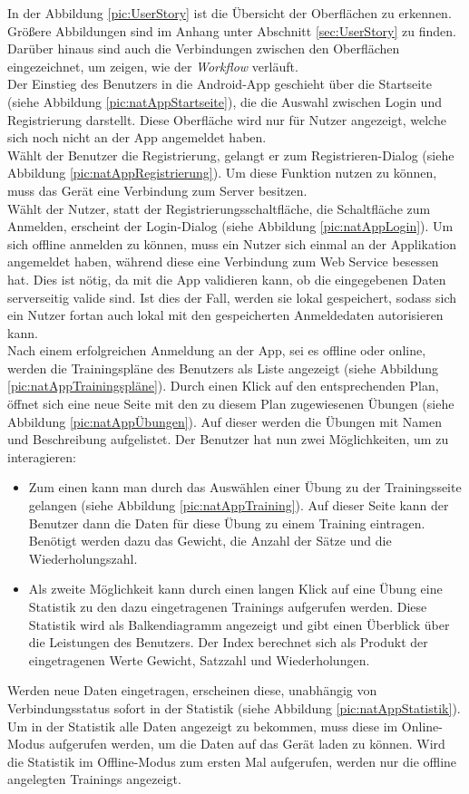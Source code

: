 In der Abbildung \ref{pic:UserStory} ist die Übersicht der Oberflächen zu erkennen. Größere Abbildungen sind im Anhang unter Abschnitt \ref{sec:UserStory} zu finden. Darüber hinaus sind auch die Verbindungen zwischen den Oberflächen eingezeichnet, um zeigen, wie der \textit{Workflow} verläuft.\\
Der Einstieg des Benutzers in die \gls{Android}-\gls{App} geschieht über die Startseite (siehe Abbildung \ref{pic:natAppStartseite}), die die Auswahl zwischen Login und Registrierung darstellt. Diese Oberfläche wird nur für Nutzer angezeigt, welche sich noch nicht an der \gls{App} angemeldet haben. \\ \newpage
Wählt der Benutzer die Registrierung, gelangt er zum Registrieren-Dialog (siehe Abbildung \ref{pic:natAppRegistrierung}). Um diese Funktion nutzen zu können, muss das Gerät eine Verbindung zum Server besitzen. \\
Wählt der Nutzer, statt der Registrierungsschaltfläche, die Schaltfläche zum Anmelden, erscheint der Login-Dialog (siehe Abbildung \ref{pic:natAppLogin}). Um sich offline anmelden zu können, muss ein Nutzer sich einmal an der Applikation angemeldet haben, während diese eine Verbindung zum Web Service besessen hat. Dies ist nötig, da mit die \gls{App} validieren kann, ob die eingegebenen Daten serverseitig valide sind. Ist dies der Fall, werden sie lokal gespeichert, sodass sich ein Nutzer fortan auch lokal mit den gespeicherten Anmeldedaten autorisieren kann.\\
Nach einem erfolgreichen Anmeldung an der \gls{App}, sei es offline oder online, werden die Trainingspläne des Benutzers als Liste angezeigt (siehe Abbildung \ref{pic:natAppTrainingspläne}). Durch einen Klick auf den entsprechenden Plan, öffnet sich eine neue Seite mit den zu diesem Plan zugewiesenen Übungen (siehe Abbildung \ref{pic:natAppÜbungen}). Auf dieser werden die Übungen mit Namen und Beschreibung aufgelistet. Der Benutzer hat nun zwei Möglichkeiten, um zu interagieren: 
\begin{itemize}
\item Zum einen kann man durch das Auswählen einer Übung zu der Trainingsseite gelangen (siehe Abbildung \ref{pic:natAppTraining}). Auf dieser Seite kann der Benutzer dann die Daten für diese Übung zu einem Training eintragen. Benötigt werden dazu das Gewicht, die Anzahl der Sätze und die Wiederholungszahl.
\item Als zweite Möglichkeit kann durch einen langen Klick auf eine Übung eine Statistik zu den dazu eingetragenen Trainings aufgerufen werden. Diese Statistik wird als Balkendiagramm angezeigt und gibt einen Überblick über die Leistungen des Benutzers. Der Index berechnet sich als Produkt der eingetragenen Werte Gewicht, Satzzahl und Wiederholungen.
\end{itemize}
Werden neue Daten eingetragen, erscheinen diese, unabhängig von Verbindungsstatus sofort in der Statistik (siehe Abbildung \ref{pic:natAppStatistik}). Um in der Statistik alle Daten angezeigt zu bekommen, muss diese im Online-Modus aufgerufen werden, um die Daten auf das Gerät laden zu können. Wird die Statistik im Offline-Modus zum ersten Mal aufgerufen, werden nur die offline angelegten Trainings angezeigt.

